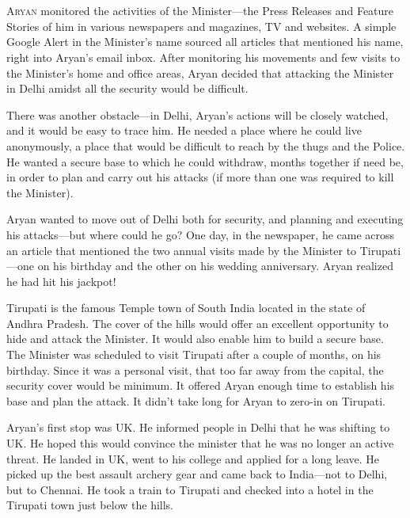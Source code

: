 \chapter{}

\lettrine{A}{ryan} monitored the activities of the Minister—the Press Releases and Feature
Stories of him in various newspapers and magazines, TV and websites. A simple
Google Alert in the Minister's name sourced all articles that mentioned his
name, right into Aryan's email inbox. After monitoring his movements and few
visits to the Minister's home and office areas, Aryan decided that attacking the
Minister in Delhi amidst all the security would be difficult.

There was another obstacle—in Delhi, Aryan's actions will be closely watched,
and it would be easy to trace him. He needed a place where he could live
anonymously, a place that would be difficult to reach by the thugs and the
Police. He wanted a secure base to which he could withdraw, months together if
need be, in order to plan and carry out his attacks (if more than one was
required to kill the Minister).

Aryan wanted to move out of Delhi both for security, and planning and executing
his attacks—but where could he go? One day, in the newspaper, he came across
an article that mentioned the two annual visits made by the Minister to
Tirupati—one on his birthday and the other on his wedding anniversary. Aryan
realized
he had hit his jackpot!

Tirupati is the famous Temple town of South India located in the state of Andhra
Pradesh. The cover of the hills would offer an excellent opportunity to hide and
attack the Minister. It would also enable him to build a secure base. The
Minister was scheduled to visit Tirupati after a couple of months, on his
birthday. Since it was a personal visit, that too far away from the capital, the
security cover would be minimum. It offered Aryan enough time to establish his
base and plan the attack. It didn't take long for Aryan to zero-in on Tirupati.

Aryan's first stop was UK. He informed people in Delhi that he was shifting to
UK. He hoped this would convince the minister that he was no longer an active
threat. He landed in UK, went to his college and applied for a long leave. He
picked up the best assault archery gear and came back to India—not to Delhi,
but to Chennai. He took a train to Tirupati and checked into a hotel in the
Tirupati town just below the hills.